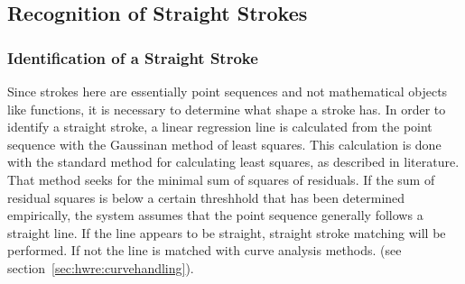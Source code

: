 


\subsection{Recognition of Straight Strokes}
\label{sec:hwre:straightstrokes}

\subsubsection{Identification of a Straight Stroke}
\label{sec:hwre:identificationstraightstroke}

Since strokes here are essentially point sequences and not mathematical objects 
like functions, it is necessary to determine what shape a stroke has.
In order to identify a straight stroke, a linear regression line is 
calculated from the point sequence with the Gaussinan method of least squares.
This calculation is done with the standard method for calculating least squares,
as described in literature. 
That method seeks for the minimal sum of squares of residuals.
If the sum of residual squares is below a certain threshhold %
that has been determined empirically, the system assumes that the point 
sequence generally follows a straight line.
If the line appears to be straight, straight stroke matching will be performed.
If not the line is matched with curve analysis methods.
(see section~\ref{sec:hwre:curvehandling}). 

